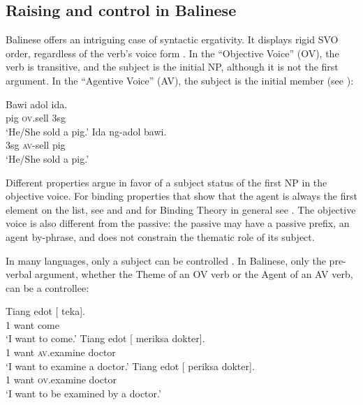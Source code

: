 \documentclass[output=paper
                ,modfonts
                ,nonflat
	        ,collection
	        ,collectionchapter
	        ,collectiontoclongg
 	        ,biblatex
                ,babelshorthands
                ,newtxmath
                ,draftmode
                ,colorlinks, citecolor=brown
]{./langsci/langscibook}
\begin{document}
\subsection{Raising and control in Balinese}
Balinese offers an intriguing case of syntactic ergativity. It displays rigid SVO order, regardless of the verb's voice form \citep{WechslerandArka1998}. In the ``Objective Voice'' (OV), the verb is transitive, and the subject is the initial NP, although it is not the first argument. In the ``Agentive Voice'' (AV), the subject is the \argst initial member (see ):

\begin{exe}
\ex \begin{xlist}
\ex \gll Bawi adol ida. \\
pig \textsc{ov}.sell 3sg \\
\glt `He/She sold a pig.' 
\ex  \gll Ida ng-adol bawi.\\
3sg \textsc{av}-sell pig\\
\glt `He/She sold a pig.'
\end{xlist}
\end{exe}

Different properties argue in favor of a subject status of the first NP in the objective voice. For
binding properties that show that the agent is always the first element on the \argst list, see
 and  and for Binding Theory in general see . The objective voice is also different from the passive: the passive may have a passive prefix, an agent by-phrase, and does not constrain the thematic role of its subject.

In many languages, only a subject
can be controlled \citep{Zaenenetal1985}. In Balinese, only the pre-verbal argument, whether the Theme of an OV verb or the Agent of an AV verb, can be a controllee:

\begin{exe}
\ex \begin{xlist}
\ex 
\gll Tiang edot [ \trace{} teka].\\
     1 want     {} {} come\\\hfill\citep[ex 25]{WechslerandArka1998}
\glt `I want to come.'
\ex 
\gll Tiang edot [ \trace{}  meriksa dokter].\\
     1     want {} {}     \textsc{av}.examine doctor\\
\glt `I want to examine a doctor.'
\ex 
\gll Tiang edot [ \trace{} periksa dokter].\\
     1     want {} {}    \textsc{ov}.examine doctor\\
\glt `I want to be examined by a doctor.'
\end{xlist}
\end{exe}
\end{document}
